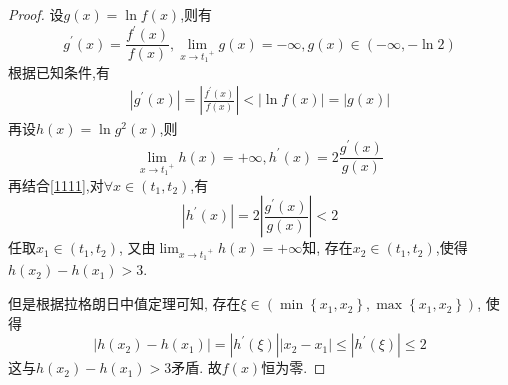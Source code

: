 \documentclass[lang=cn,newtx,10pt,scheme=chinese]{../Template/elegantbook}
\begin{document}
\begin{proof}
设$g(x)=\ln f(x)$,则有
\begin{equation}
g^{\prime}(x)=\frac{f^{\prime}(x)}{f(x)}
,\lim_{x\rightarrow {t_1}^{+}} g\left( x \right) =-\infty ,g\left( x \right) \in \left( -\infty ,-\ln 2 \right) 
\nonumber
\end{equation}
根据已知条件,有
\begin{equation}\label{1111}
\begin{split}
\left| g^{\prime}\left( x \right) \right|=\left| \frac{f^{\prime}\left( x \right)}{f\left( x \right)} \right|<\left| \ln f\left( x \right) \right|=\left| g\left( x \right) \right|
\end{split}
\end{equation}
再设$h(x)=\ln g^2(x)$,则
\begin{equation}
\lim_{x\rightarrow {t_1}^{+}} h\left( x \right) =+\infty
,h^{\prime}(x)=2\frac{g^{\prime}(x)}{g(x)}
\nonumber
\end{equation}
再结合\eqref{1111},对$\forall x\in(t_1,t_2)$,有
\begin{equation}
\left| h^{\prime}(x) \right|=2\left| \frac{g^{\prime}(x)}{g(x)} \right|<2
\nonumber
\end{equation}
任取$x_1\in(t_1,t_2)$,
又由$\lim_{x\rightarrow {t_1}^{+}} h\left( x \right) =+\infty$知,
存在$x_2\in (t_1,t_2)$,使得$h(x_2)-h(x_1)>3$.

但是根据拉格朗日中值定理可知,
存在$\xi \in \left( \min \left\{ x_1,x_2 \right\} ,\max \left\{ x_1,x_2 \right\} \right)$,
使得
\begin{equation}
\left| h\left( x_2 \right) -h\left( x_1 \right) \right|=\left| h^{\prime}\left( \xi \right) \right|\left| x_2-x_1 \right|\le \left| h^{\prime}\left( \xi \right) \right|\le 2
\nonumber
\end{equation}
这与$h(x_2)-h(x_1)>3$矛盾.
故$f(x)$恒为零.

\end{proof}
\end{document}
